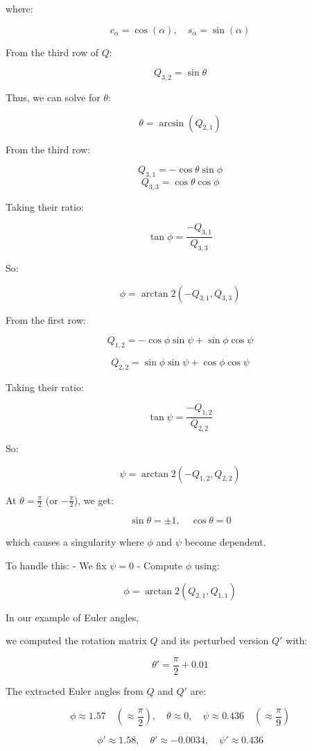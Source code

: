 \documentclass[12pt]{article}
\begin{document}
where:

\[
c_\alpha = \cos(\alpha), \quad s_\alpha = \sin(\alpha)
\]

From the third row of \( Q \):

\[
Q_{3,2} = \sin\theta
\]

Thus, we can solve for \( \theta \):

\[
\theta = \arcsin(Q_{2,1})
\]

From the third row:

\[
Q_{3,1} = -\cos\theta \sin\phi
\]
\[
Q_{3,3} = \cos\theta \cos\phi
\]

Taking their ratio:

\[
\tan\phi = \frac{-Q_{3,1}}{Q_{3,3}}
\]

So:

\[
\phi = \arctan2(-Q_{3,1}, Q_{3,3})
\]


From the first row:

\[
Q_{1,2} = -\cos\phi \sin\psi + \sin\phi \cos\psi
\]

\[
Q_{2,2} = \sin\phi \sin\psi + \cos\phi \cos\psi
\]

Taking their ratio:

\[
\tan\psi = \frac{-Q_{1,2}}{Q_{2,2}}
\]

So:

\[
\psi = \arctan2(-Q_{1,2}, Q_{2,2})
\]

At \( \theta = \frac{\pi}{2} \) (or \( -\frac{\pi}{2} \)), we get:

\[
\sin\theta = \pm1, \quad \cos\theta = 0
\]

which causes a singularity where \( \phi \) and \( \psi \) become dependent.

To handle this:
- We fix \( \psi = 0 \)
- Compute \( \phi \) using:

\[
\phi = \arctan2(Q_{2,1}, Q_{1,1})
\]

In our example of Euler angles, \newline\newline

we computed the rotation matrix \( Q \) and its perturbed version \( Q' \) with:

\[
\theta' = \frac{\pi}{2} + 0.01
\]

The extracted Euler angles from \( Q \) and \( Q' \) are:


\[
\phi \approx 1.57 \quad \left(\approx \frac{\pi}{2}\right), \quad
\theta \approx 0, \quad
\psi \approx 0.436 \quad \left(\approx \frac{\pi}{9}\right)
\]


\[
\phi' \approx 1.58, \quad
\theta' \approx -0.0034, \quad
\psi' \approx 0.436
\]
\end{document}
